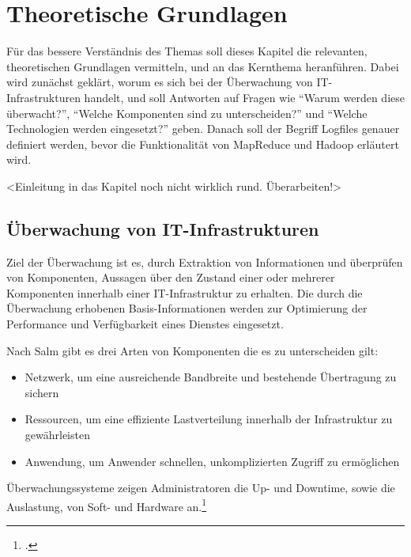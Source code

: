 
\chapter{Theoretische Grundlagen}\label{cha:Grundlagen}
Für das bessere Verständnis des Themas soll dieses Kapitel die relevanten, theoretischen Grundlagen vermitteln,  und an das Kernthema heranführen. Dabei wird zunächst geklärt, worum es sich bei der Überwachung von IT-Infrastrukturen handelt, und soll Antworten auf Fragen wie "`Warum werden diese überwacht?"', "`Welche Komponenten sind zu unterscheiden?"' und "`Welche Technologien werden eingesetzt?"' geben. Danach soll der Begriff Logfiles genauer definiert werden, bevor die Funktionalität von MapReduce und Hadoop erläutert wird.

<Einleitung in das Kapitel noch nicht wirklich rund. Überarbeiten!>


\section{Überwachung von IT-Infrastrukturen}\label{sec:UeberwachungIT}
Ziel der Überwachung ist es, durch Extraktion von Informationen und überprüfen von Komponenten, Aussagen über den Zustand einer oder mehrerer Komponenten innerhalb einer IT-Infrastruktur zu erhalten. Die durch die Überwachung erhobenen Basis-Informationen werden zur Optimierung der Performance und Verfügbarkeit eines Dienstes eingesetzt.

Nach Salm gibt es drei Arten von Komponenten die es zu unterscheiden gilt:

\begin{itemize}
	\item Netzwerk, um eine ausreichende Bandbreite und bestehende Übertragung zu sichern
	\item Ressourcen, um eine effiziente Lastverteilung innerhalb der Infrastruktur zu gewährleisten
	\item Anwendung, um Anwender schnellen, unkomplizierten Zugriff zu ermöglichen
\end{itemize}

Überwachungssysteme zeigen Administratoren die Up- und Downtime, sowie die Auslastung, von Soft- und Hardware an.\footcite[Vgl.][S. 8]{Salm.2007}

